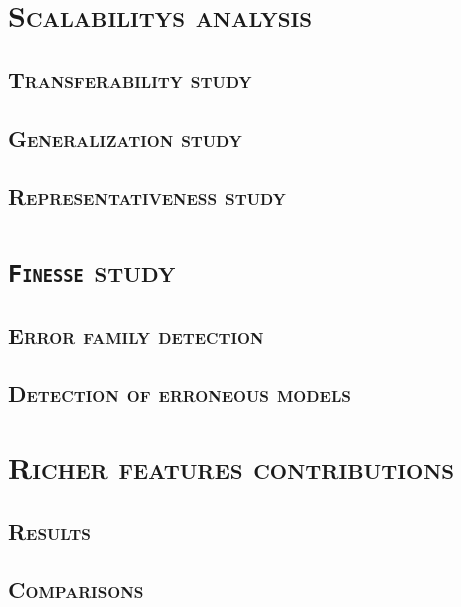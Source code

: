 \minitoc

\vfill

\clearpage

\section{\textsc{Scalabilitys analysis}}
    \label{sec::more_experiments::scalability}
    \subsection{\textsc{Transferability study}}
        \subsubsection{\textsc{}}
        \subsubsection{\textsc{}}
        \subsubsection{\textsc{}}
    \subsection{\textsc{Generalization study}}
        \subsubsection{\textsc{}}
        \subsubsection{\textsc{}}
        \subsubsection{\textsc{}}
    \subsection{\textsc{Representativeness study}}
        \subsubsection{\textsc{}}

\section{\textsc{\texttt{Finesse} study}}
    \subsection{\textsc{Error family detection}}
    \subsection{\textsc{Detection of erroneous models}}

\section{\textsc{Richer features contributions}}
    \subsection{\textsc{Results}}
    \subsection{\textsc{Comparisons}}
